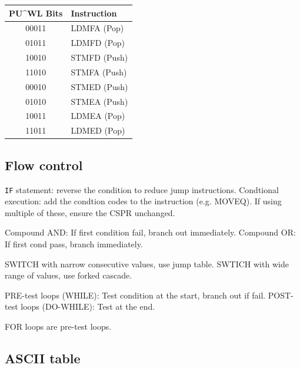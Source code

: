 \documentclass[../comorg-part1.tex]{subfiles}
\begin{document}
\begin{table}[H]
\centering
\begin{tabular}{cl}
\hline
\textbf{PU\^{}WL Bits} & \textbf{Instruction} \\
\hline
00011 & LDMFA (Pop) \\
01011 & LDMFD (Pop) \\
10010 & STMFD (Push) \\
11010 & STMFA (Push) \\
00010 & STMED (Push) \\
01010 & STMEA (Push) \\
10011 & LDMEA (Pop) \\
11011 & LDMED (Pop) \\
\hline
\end{tabular}
\end{table}

\subsection{Flow control}
\texttt{IF} statement: reverse the condition to reduce jump instructions.\newline
Condtional execution: add the condtion codes to the instruction (e.g. MOVEQ). If using multiple of these, ensure the CSPR unchanged.\newline

\smallskip
\noindent Compound AND: If first condition fail, branch out immediately.\newline
Compound OR: If first cond pass, branch immediately.\newline

\smallskip
\noindent SWITCH with narrow consecutive values, use jump table.\newline
SWTICH with wide range of values, use forked cascade.\newline

\smallskip
\noindent PRE-test loops (WHILE): Test condition at the start, branch out if fail.\newline
POST-test loops (DO-WHILE): Test at the end.\newline

\smallskip
\noindent FOR loops are pre-test loops.

\newpage

\subsection{ASCII table}

\end{document}
